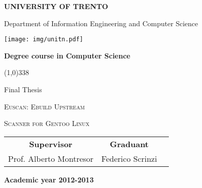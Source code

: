 \begin{titlepage}
  \pagestyle{empty}

  \begin{center}
    {\bfseries
      \Large {\huge U}NIVERSITY OF {\huge T}RENTO}

    \vspace{0.2cm}

    {\Large Department of Information Engineering and Computer Science}

    \vspace{0.5cm}

    \begin{center}
      \texttt{[image: img/unitn.pdf]}
    \end{center}

    \vspace{0.5cm}

    {\bfseries \Large Degree course in Computer Science}

    \vspace{0.3cm}
    \line(1,0){338}
    \vspace{0.3cm}

    {\Large Final Thesis}

    \vspace{2.5cm}

    {\huge \textsc{Euscan: Ebuild Upstream}\\}

    \vspace{0.2cm}

    {\huge \textsc{Scanner for Gentoo Linux}}

    \vspace{3.0cm}


    \large
    \begin{center}
      \begin{tabular}{ccc}
        {\bfseries Supervisor} &
        \hspace{5cm}
        {\bfseries Graduant} \\

        Prof. Alberto Montresor &
        \hspace{5cm} Federico Scrinzi \\


      \end{tabular}
    \end{center}
    \vspace{2cm}

    {\bfseries \large Academic year 2012-2013}
    \vfill
  \end{center}
\end{titlepage}

